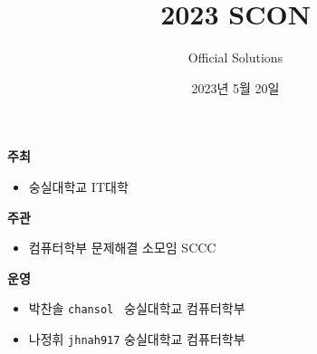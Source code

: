 
\usetikzlibrary{arrows.meta,matrix,decorations.pathreplacing}

\title{2023 SCON}
\subtitle{}
\author{Official Solutions}
\date{2023년 5월 20일}


    \setcounter{framenumber}{-1}
    \frame{\titlepage}

    \begin{frame} %
        \textbf{주최} %
        \begin{itemize}
            \item 숭실대학교 IT대학
        \end{itemize}
        \vspace{3mm}
        \textbf{주관} %
        \begin{itemize}
            \item 컴퓨터학부 문제해결 소모임 SCCC
        \end{itemize}
        \vspace{3mm}
        \textbf{운영} %
        \begin{itemize}
            \item 박찬솔 \tabto{1.2cm} \texttt{chansol } \tabto{4cm} {\color{gray} } \tabto{8cm} {\color{gray} 숭실대학교 컴퓨터학부}
            \item 나정휘 \tabto{1.2cm} \texttt{jhnah917} \tabto{4cm} {\color{gray} } \tabto{8cm} {\color{gray} 숭실대학교 컴퓨터학부}
        \end{itemize}
        \vspace{3mm}
        
    \end{frame}
    
